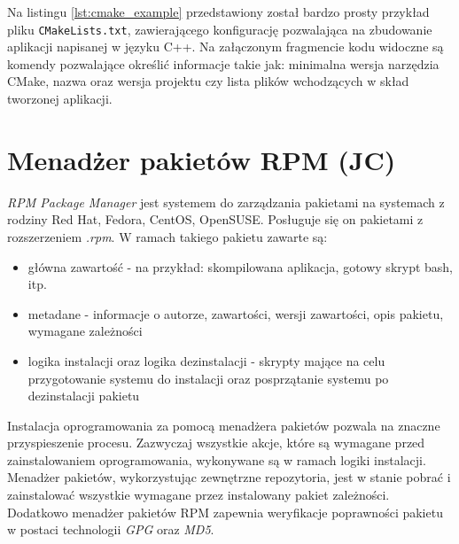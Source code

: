 Na listingu \ref{lst:cmake_example} przedstawiony został bardzo prosty przykład pliku \lstinline{CMakeLists.txt}, zawierającego konfigurację pozwalająca na zbudowanie aplikacji napisanej w języku C++. Na załączonym fragmencie kodu widoczne są komendy pozwalające określić informacje takie jak: minimalna wersja narzędzia CMake, nazwa oraz wersja projektu czy lista plików wchodzących w skład tworzonej aplikacji.



\section{Menadżer pakietów RPM (JC)}
\emph{RPM Package Manager} jest systemem do zarządzania pakietami na systemach z rodziny Red Hat, Fedora, CentOS, OpenSUSE. Posługuje się on pakietami z rozszerzeniem \emph{.rpm}. W ramach takiego pakietu zawarte są:
\begin{itemize}
    \item główna zawartość - na przykład: skompilowana aplikacja, gotowy skrypt bash, itp.
    \item metadane - informacje o autorze, zawartości, wersji zawartości, opis pakietu, wymagane zależności
    \item logika instalacji oraz logika dezinstalacji - skrypty mające na celu przygotowanie systemu do instalacji oraz posprzątanie systemu po dezinstalacji pakietu
\end{itemize}

Instalacja oprogramowania za pomocą menadżera pakietów pozwala na znaczne przyspieszenie procesu. Zazwyczaj wszystkie akcje, które są wymagane przed zainstalowaniem oprogramowania, wykonywane są w ramach logiki instalacji. Menadżer pakietów, wykorzystując zewnętrzne repozytoria, jest w stanie pobrać i zainstalować wszystkie wymagane przez instalowany pakiet zależności. Dodatkowo menadżer pakietów RPM zapewnia weryfikacje poprawności pakietu w postaci technologii \emph{GPG} oraz \emph{MD5}.

